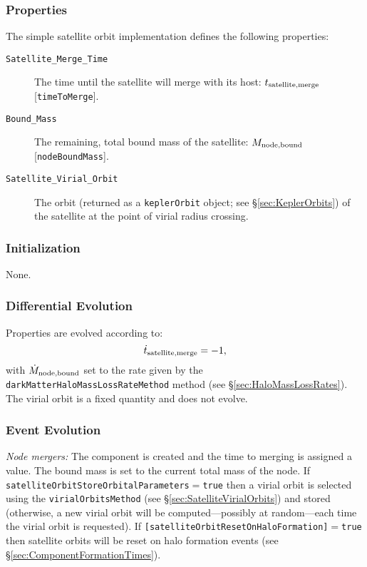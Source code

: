\subsubsection{Properties}

The simple satellite orbit implementation defines the following properties:
\begin{description}
 \item [{\tt Satellite\_Merge\_Time}] The time until the satellite will merge with its host: $t_{\rm satellite, merge}$ [{\tt timeToMerge}].
 \item [{\tt Bound\_Mass}] The remaining, total bound mass of the satellite: $M_{\rm node,bound}$ [{\tt nodeBoundMass}].
 \item[{\tt Satellite\_Virial\_Orbit}] The orbit (returned as a {\tt keplerOrbit} object; see \S\ref{sec:KeplerOrbits}) of the satellite at the point of virial radius crossing.
\end{description}

\subsubsection{Initialization}

None.

\subsubsection{Differential Evolution}

Properties are evolved according to:
\begin{equation}
 \dot{t}_{\rm satellite, merge} = -1,
\end{equation}
with $\dot{M}_{\rm node,bound}$ set to the rate given by the {\tt darkMatterHaloMassLossRateMethod} method (see \S\ref{sec:HaloMassLossRates}). The virial orbit is a fixed quantity and does not evolve.

\subsubsection{Event Evolution}

\noindent\emph{Node mergers:} The component is created and the time to merging is assigned a value. The bound mass is set to the current total mass of the node. If {\tt satelliteOrbitStoreOrbitalParameters}$=${\tt true} then a virial orbit is selected using the {\tt virialOrbitsMethod} (see \S\ref{sec:SatelliteVirialOrbits}) and stored (otherwise, a new virial orbit will be computed---possibly at random---each time the virial orbit is requested). If {\tt [satelliteOrbitResetOnHaloFormation]}$=${\tt true} then satellite orbits will be reset on halo formation events (see \S\ref{sec:ComponentFormationTimes}).\\

